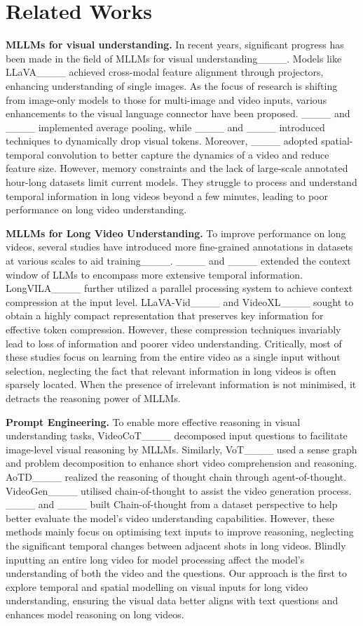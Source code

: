\section{Related Works}
\noindent\textbf{MLLMs for visual understanding.} In recent years,
significant progress has been made in the field of MLLMs for visual
understanding____. Models
like LLaVA____ achieved cross-modal feature
alignment through projectors, enhancing understanding of single
images. As the focus of research is shifting from image-only models to
those for multi-image and video inputs, various enhancements to the
visual language connector have been proposed. ____ and
____ implemented average pooling, while
____ and ____ introduced techniques to dynamically drop
visual tokens. Moreover, ____ adopted
spatial-temporal convolution to better capture the dynamics of a video
and reduce feature size. 
%
However, memory constraints and the lack of large-scale annotated
hour-long datasets limit current models. They struggle to process and
understand temporal information in long videos beyond a few minutes,
leading to poor performance on long video understanding. 

\noindent\textbf{MLLMs for Long Video Understanding.} To improve
performance on long videos, several studies have introduced more
fine-grained annotations in datasets at various scales to aid
training____. ____
and ____ extended the context window of LLMs to encompass more
extensive temporal information. LongVILA____
further utilized a parallel processing system to achieve context
compression at the input level. LLaVA-Vid____ and
VideoXL____ sought to obtain a highly compact
representation that preserves key information for effective token
compression. However, these compression techniques invariably lead to
loss of information and poorer video understanding. Critically,
most of these studies focus on learning from the entire video as a single input without selection, neglecting the fact that relevant
information in long videos is often sparsely located. When the presence of irrelevant information is not minimised, it detracts the reasoning power of MLLMs. 

\noindent\textbf{Prompt Engineering.} To enable more effective
reasoning in visual understanding tasks,
VideoCoT____ decomposed input questions to
facilitate image-level visual reasoning by MLLMs. Similarly,
VoT____ used a sense graph and problem decomposition
to enhance short video comprehension and reasoning.  
%
AoTD____ realized the reasoning of thought chain through agent-of-thought.
%
VideoGen____ utilised chain-of-thought to assist the video generation process.
%
____ and ____ built Chain-of-thought from a dataset perspective to help better evaluate the model's video understanding capabilities.
%
However, these methods mainly focus on optimising text inputs to
improve reasoning, neglecting the significant temporal changes between
adjacent shots in long videos. Blindly inputting an entire long video
for model processing affect the model’s understanding of both the video and the
questions. Our approach is the first to explore temporal and spatial
modelling on visual inputs for long video understanding, ensuring the visual data better aligns
with text questions and enhances model reasoning on long videos.
